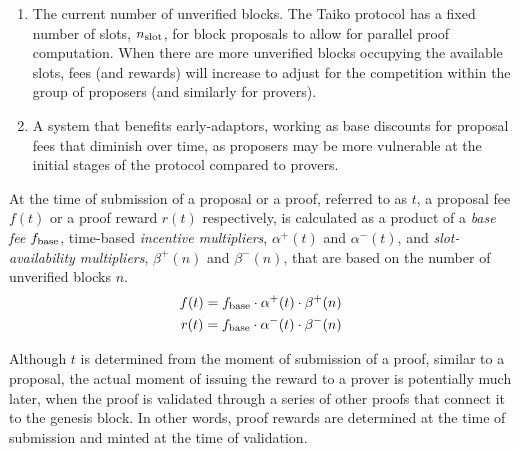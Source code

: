 \documentclass[9pt,oneside]{amsart}
\begin{document}
\begin{multicols}{2}
\begin{enumerate}
\item The current number of unverified blocks. The Taiko protocol has a fixed number of slots, $n_\textnormal{slot}$, for block proposals to allow for parallel proof computation. When there are more unverified blocks occupying the available slots, fees (and rewards) will increase to adjust for the competition within the group of proposers (and similarly for provers).

\item A system that benefits early-adaptors, working as base discounts for proposal fees that diminish over time, as proposers may be more vulnerable at the initial stages of the protocol compared to provers.
\end{enumerate}


At the time of submission of a proposal or a proof, referred to as $t$, a proposal fee $f(t)$ or a proof reward $r(t)$ respectively, is calculated as a product of a \textit{base fee} $f_\textnormal{base}$, time-based \emph{incentive multipliers}, $\alpha^+(t)$ and $\alpha^-(t)$, and \emph{slot-availability multipliers}, $\beta^+(n)$ and $\beta^-(n)$, that are based on the number of unverified blocks $n$.
\begin{align}
f(t) = f_\textnormal{base} \cdot \alpha^+(t) \cdot \beta^+(n)
\\
r(t) = f_\textnormal{base}
\cdot \alpha^-(t) \cdot \beta^-(n)
\end{align}

Although $t$ is determined from the moment of submission of a proof, similar to a proposal, the actual moment of issuing the reward to a prover is potentially much later, when the proof is validated through a series of other proofs that connect it to the genesis block. In other words, proof rewards are determined at the time of submission and minted at the time of validation. 


\end{multicols}
\end{document}
